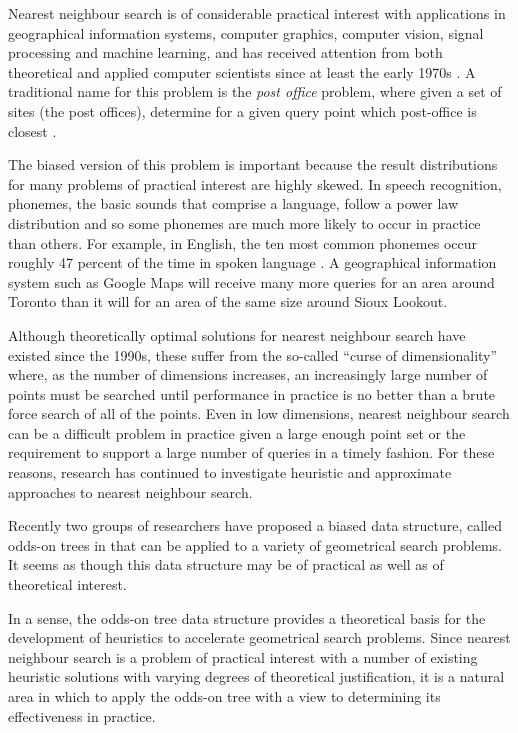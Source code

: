 \documentclass[mcs]{scsthesis}
\begin{document}
Nearest neighbour search is of considerable practical interest with
applications in geographical information systems, computer graphics,
computer vision, signal processing and machine learning, and has received
attention from both theoretical and applied computer scientists since at least
the early 1970s \cite{knuth} \cite{kdtree}. A traditional name for this problem
is the \emph{post office} problem, where given a set of sites (the post
offices), determine for a given query point which post-office is closest
\cite{knuth}.

The biased version of this problem is important because the result distributions
for many problems of practical interest are highly skewed.  In speech
recognition, phonemes, the basic sounds that comprise a language, follow a power
law distribution \cite{yule} and so some phonemes are much more likely to occur
in practice than others. For example, in English, the ten most common phonemes
occur roughly 47 percent of the time in spoken language \cite{english-frequency}.
A geographical information system such as Google Maps will receive many more
queries for an area around Toronto than it will for an area of the same
size around Sioux Lookout.

Although theoretically optimal solutions for nearest neighbour search have
existed since the 1990s, these suffer from the so-called ``curse of
dimensionality'' where, as the number of dimensions increases, an increasingly
large number of points must be searched until performance in practice is no
better than a brute force search of all of the points. Even in low dimensions,
nearest neighbour search can be a difficult problem in practice given a large
enough point set or the requirement to support a large number of queries in a
timely fashion. For these reasons, research has continued to investigate
heuristic and approximate approaches to nearest neighbour search. 
 
Recently two groups of researchers \cite{oddson,chan} have proposed
a biased data structure, called odds-on trees in \cite{oddson} that can be
applied to a variety of geometrical search problems. It seems as though this 
data structure may be of practical as well as of theoretical interest.

In a sense, the odds-on tree data structure provides a theoretical basis for
the development of heuristics to accelerate geometrical search problems. Since
nearest neighbour search is a problem of practical interest with a number of
existing heuristic solutions with varying degrees of theoretical justification,
it is a natural area in which to apply the odds-on tree with a view to
determining its effectiveness in practice.
\end{document}
